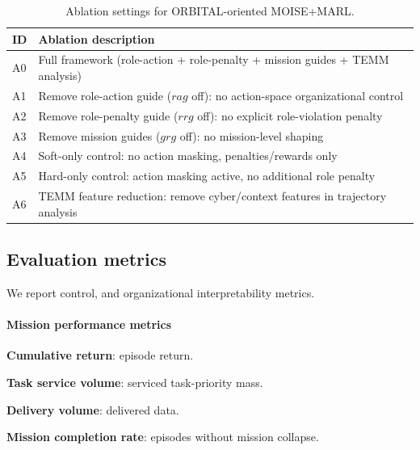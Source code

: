 \documentclass[sigconf]{aamas}
\begin{document}
\begin{table}[h!]
    \caption{Ablation settings for ORBITAL-oriented MOISE+MARL.}
    \label{tab:exp-ablations}
    \centering
    \scriptsize
    \begin{tabularx}{\columnwidth}{p{1.5cm} X}
        \toprule
        ID & Ablation description                                                         \\
        \midrule
        A0 & Full framework (role-action + role-penalty + mission guides + TEMM analysis) \\
        A1 & Remove role-action guide ($rag$ off): no action-space organizational control \\
        A2 & Remove role-penalty guide ($rrg$ off): no explicit role-violation penalty    \\
        A3 & Remove mission guides ($grg$ off): no mission-level shaping                  \\
        A4 & Soft-only control: no action masking, penalties/rewards only                 \\
        A5 & Hard-only control: action masking active, no additional role penalty         \\
        A6 & TEMM feature reduction: remove cyber/context features in trajectory analysis \\
        \bottomrule
    \end{tabularx}
\end{table}

\subsection{Evaluation metrics}
We report control, and organizational interpretability metrics.

\paragraph{Mission performance metrics}
\begin{enumerate*}[label={\roman*) },itemjoin={; \quad}]
    \item \textbf{Cumulative return}: episode return.
    \item \textbf{Task service volume}: serviced task-priority mass.
    \item \textbf{Delivery volume}: delivered data.
    \item \textbf{Mission completion rate}: episodes without mission collapse.
\end{enumerate*}
\end{document}
